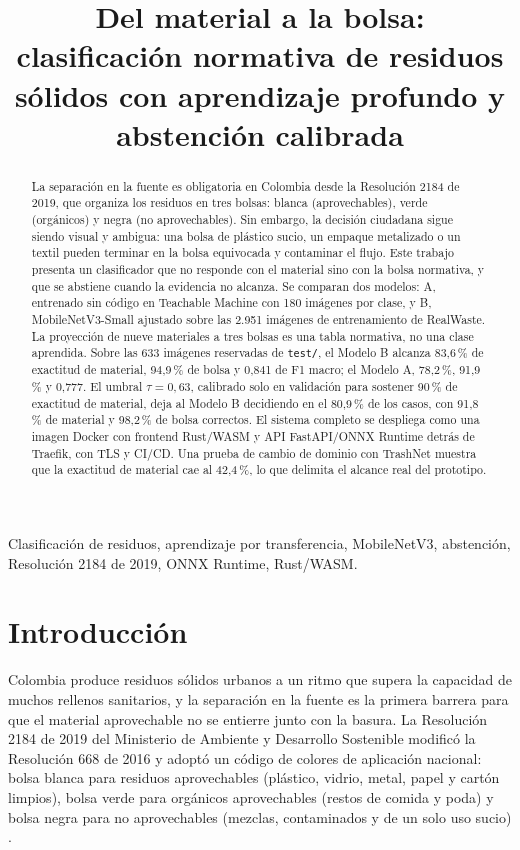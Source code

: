 \documentclass[10pt]{ieeeconf}
\title{Del material a la bolsa: clasificaci\'on normativa de residuos s\'olidos
con aprendizaje profundo y abstenci\'on calibrada}
\begin{document}
\maketitle

\begin{abstract}
La separaci\'on en la fuente es obligatoria en Colombia desde la Resoluci\'on 2184
de 2019, que organiza los residuos en tres bolsas: blanca (aprovechables), verde
(org\'anicos) y negra (no aprovechables). Sin embargo, la decisi\'on ciudadana
sigue siendo visual y ambigua: una bolsa de pl\'astico sucio, un empaque
metalizado o un textil pueden terminar en la bolsa equivocada y contaminar el
flujo. Este trabajo presenta un clasificador que no responde con el material sino
con la bolsa normativa, y que se abstiene cuando la evidencia no alcanza. Se
comparan dos modelos: A, entrenado sin c\'odigo en Teachable Machine con 180
im\'agenes por clase, y B, MobileNetV3-Small ajustado sobre las 2.951 im\'agenes
de entrenamiento de RealWaste. La proyecci\'on de nueve materiales a tres bolsas
es una tabla normativa, no una clase aprendida. Sobre las 633 im\'agenes
reservadas de \texttt{test/}, el Modelo B alcanza 83,6\,\% de exactitud de
material, 94,9\,\% de bolsa y 0,841 de F1 macro; el Modelo A, 78,2\,\%, 91,9\,\% y
0,777. El umbral $\tau=0{,}63$, calibrado solo en validaci\'on para sostener
90\,\% de exactitud de material, deja al Modelo B decidiendo en el 80,9\,\% de los
casos, con 91,8\,\% de material y 98,2\,\% de bolsa correctos. El sistema completo
se despliega como una imagen Docker con frontend Rust/WASM y API FastAPI/ONNX
Runtime detr\'as de Traefik, con TLS y CI/CD. Una prueba de cambio de dominio con
TrashNet muestra que la exactitud de material cae al 42,4\,\%, lo que delimita el
alcance real del prototipo.
\end{abstract}

\begin{IEEEkeywords}
Clasificaci\'on de residuos, aprendizaje por transferencia, MobileNetV3,
abstenci\'on, Resoluci\'on 2184 de 2019, ONNX Runtime, Rust/WASM.
\end{IEEEkeywords}

\section{Introducci\'on}
\label{sec:intro}

Colombia produce residuos s\'olidos urbanos a un ritmo que supera la capacidad de
muchos rellenos sanitarios, y la separaci\'on en la fuente es la primera barrera
para que el material aprovechable no se entierre junto con la basura. La
Resoluci\'on 2184 de 2019 del Ministerio de Ambiente y Desarrollo Sostenible
modific\'o la Resoluci\'on 668 de 2016 y adopt\'o un c\'odigo de colores de
aplicaci\'on nacional: bolsa blanca para residuos aprovechables (pl\'astico,
vidrio, metal, papel y cart\'on limpios), bolsa verde para org\'anicos
aprovechables (restos de comida y poda) y bolsa negra para no aprovechables
(mezclas, contaminados y de un solo uso sucio) \cite{res2184}.
\end{document}
